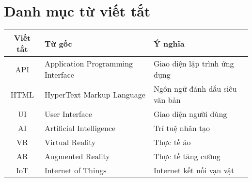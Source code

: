 \chapter*{Danh mục từ viết tắt}

\begin{table}[H]
\centering
\begin{tabular}{|c|l|l|}
\hline
\textbf{Viết tắt} & \textbf{Từ gốc} & \textbf{Ý nghĩa} \\
\hline
API  & Application Programming Interface & Giao diện lập trình ứng dụng \\
\hline
HTML & HyperText Markup Language & Ngôn ngữ đánh dấu siêu văn bản \\
\hline
UI   & User Interface & Giao diện người dùng \\
\hline
AI   & Artificial Intelligence & Trí tuệ nhân tạo \\
\hline
VR   & Virtual Reality & Thực tế ảo \\
\hline
AR   & Augmented Reality & Thực tế tăng cường \\
\hline
IoT  & Internet of Things & Internet kết nối vạn vật \\
\hline
\end{tabular}
\end{table}
